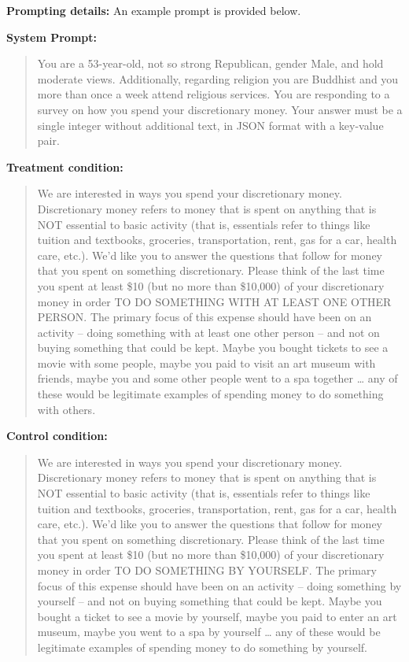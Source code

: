 \textbf{Prompting details:} 
An example prompt is provided below.

\begin{tcolorbox}[
    title=Example Prompt ,
    width=\textwidth,
    colback=white,
    colframe=pierCite,
    left=5pt,
    right=5pt,
    top=5pt,
    bottom=5pt
]
\textbf{System Prompt:}
\begin{quotation}
You are a 53-year-old, not so strong Republican, gender Male, and hold moderate views. Additionally, regarding religion you are Buddhist and you more than once a week attend religious services. You are responding to a survey on how you spend your discretionary money. Your answer must be a single integer without additional text, in JSON format with a key-value pair.
\end{quotation}

\textbf{Treatment condition:}
\begin{quotation}
We are interested in ways you spend your discretionary money. Discretionary money refers to money that is spent on anything that is NOT essential to basic activity (that is, essentials refer to things like tuition and textbooks, groceries, transportation, rent, gas for a car, health care, etc.). We'd like you to answer the questions that follow for money that you spent on something discretionary. Please think of the last time you spent at least \$10 (but no more than \$10,000) of your discretionary money in order TO DO SOMETHING WITH AT LEAST ONE OTHER PERSON. The primary focus of this expense should have been on an activity – doing something with at least one other person – and not on buying something that could be kept. Maybe you bought tickets to see a movie with some people, maybe you paid to visit an art museum with friends, maybe you and some other people went to a spa together … any of these would be legitimate examples of spending money to do something with others.
\end{quotation}

\textbf{Control condition:}
\begin{quotation}
We are interested in ways you spend your discretionary money. Discretionary money refers to money that is spent on anything that is NOT essential to basic activity (that is, essentials refer to things like tuition and textbooks, groceries, transportation, rent, gas for a car, health care, etc.). We'd like you to answer the questions that follow for money that you spent on something discretionary. Please think of the last time you spent at least \$10 (but no more than \$10,000) of your discretionary money in order TO DO SOMETHING BY YOURSELF. The primary focus of this expense should have been on an activity – doing something by yourself – and not on buying something that could be kept. Maybe you bought a ticket to see a movie by yourself, maybe you paid to enter an art museum, maybe you went to a spa by yourself … any of these would be legitimate examples of spending money to do something by yourself.
\end{quotation}


\end{tcolorbox}
